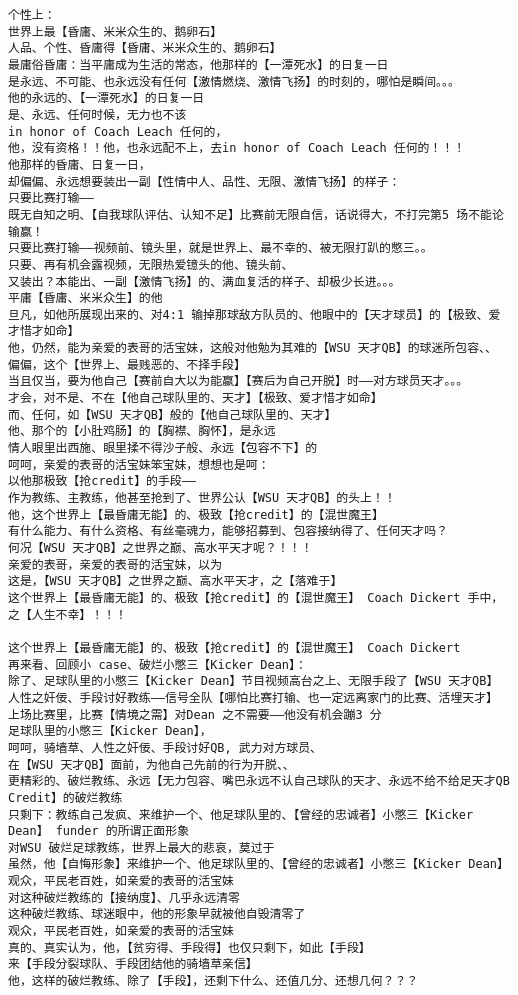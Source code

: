 \documentclass[9pt, b5paper]{article}
\begin{document}
\begin{verbatim}
个性上：
世界上最【昏庸、米米众生的、鹅卵石】
人品、个性、昏庸得【昏庸、米米众生的、鹅卵石】
最庸俗昏庸：当平庸成为生活的常态，他那样的【一潭死水】的日复一日
是永远、不可能、也永远没有任何【激情燃烧、激情飞扬】的时刻的，哪怕是瞬间。。。
他的永远的、【一潭死水】的日复一日
是、永远、任何时候，无力也不该
in honor of Coach Leach 任何的，
他，没有资格！！他，也永远配不上，去in honor of Coach Leach 任何的！！！
他那样的昏庸、日复一日，
却偏偏、永远想要装出一副【性情中人、品性、无限、激情飞扬】的样子：
只要比赛打输——
既无自知之明、【自我球队评估、认知不足】比赛前无限自信，话说得大，不打完第5 场不能论输赢！
只要比赛打输——视频前、镜头里，就是世界上、最不幸的、被无限打趴的憋三。。
只要、再有机会露视频，无限热爱镱头的他、镜头前、
又装出？本能出、一副【激情飞扬】的、满血复活的样子、却极少长进。。。
平庸【昏庸、米米众生】的他
旦凡，如他所展现出来的、对4:1 输掉那球敌方队员的、他眼中的【天才球员】的【极致、爱才惜才如命】
他，仍然，能为亲爱的表哥的活宝妹，这般对他勉为其难的【WSU 天才QB】的球迷所包容、、
偏偏，这个【世界上、最贱恶的、不择手段】
当且仅当，要为他自己【赛前自大以为能赢】【赛后为自己开脱】时——对方球员天才。。。
才会，对不是、不在【他自己球队里的、天才】【极致、爱才惜才如命】
而、任何，如【WSU 天才QB】般的【他自己球队里的、天才】
他、那个的【小肚鸡肠】的【胸襟、胸怀】，是永远
情人眼里出西施、眼里揉不得沙子般、永远【包容不下】的
呵呵，亲爱的表哥的活宝妹笨宝妹，想想也是呵：
以他那极致【抢credit】的手段——
作为教练、主教练，他甚至抢到了、世界公认【WSU 天才QB】的头上！！
他，这个世界上【最昏庸无能】的、极致【抢credit】的【混世魔王】
有什么能力、有什么资格、有丝毫魂力，能够招募到、包容接纳得了、任何天才吗？
何况【WSU 天才QB】之世界之巅、高水平天才呢？！！！
亲爱的表哥，亲爱的表哥的活宝妹，以为
这是，【WSU 天才QB】之世界之巅、高水平天才，之【落难于】
这个世界上【最昏庸无能】的、极致【抢credit】的【混世魔王】 Coach Dickert 手中，之【人生不幸】！！！

这个世界上【最昏庸无能】的、极致【抢credit】的【混世魔王】 Coach Dickert
再来看、回顾小 case、破烂小憋三【Kicker Dean】：
除了、足球队里的小憋三【Kicker Dean】节目视频高台之上、无限手段了【WSU 天才QB】
人性之奸佞、手段讨好教练——信号全队【哪怕比赛打输、也一定远离家门的比赛、活埋天才】
上场比赛里，比赛【情境之需】对Dean 之不需要——他没有机会蹦3 分
足球队里的小憋三【Kicker Dean】，
呵呵，骑墙草、人性之奸佞、手段讨好QB, 武力对方球员、
在【WSU 天才QB】面前，为他自己先前的行为开脱、、
更精彩的、破烂教练、永远【无力包容、嘴巴永远不认自己球队的天才、永远不给不给足天才QB Credit】的破烂教练
只剩下：教练自己发疯、来维护一个、他足球队里的、【曾经的忠诚者】小憋三【Kicker Dean】 funder 的所谓正面形象
对WSU 破烂足球教练，世界上最大的悲哀，莫过于
虽然，他【自悔形象】来维护一个、他足球队里的、【曾经的忠诚者】小憋三【Kicker Dean】
观众，平民老百姓，如亲爱的表哥的活宝妹
对这种破烂教练的【接纳度】、几乎永远清零
这种破烂教练、球迷眼中，他的形象早就被他自毁清零了
观众，平民老百姓，如亲爱的表哥的活宝妹
真的、真实认为，他，【贫穷得、手段得】也仅只剩下，如此【手段】
来【手段分裂球队、手段团结他的骑墙草亲信】
他，这样的破烂教练、除了【手段】，还剩下什么、还值几分、还想几何？？？


\end{verbatim}
\end{document}
